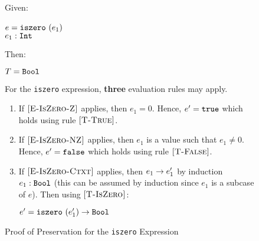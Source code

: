 \documentclass{report}
\newcommand{\rel}[1]{ \mbox{\sc [#1]} }
\begin{document}
\begin{figure}[ht!]
Given:
\begin{center}
   $e = \mbox{\tt iszero}~(e_1)$~\\
   ${e_1} : {\mbox{\tt Int}}$
\end{center}
Then:
\begin{center}
   $T = \mbox{\tt Bool}$
\end{center}
For the \texttt{iszero} expression, \textbf{three} evaluation rules may apply.
\begin{enumerate}

    \item If $\rel{E-IsZero-Z}$ applies, then $e_1 = 0$.  Hence, $e' = \mbox{\tt true}$ which holds using rule $\rel{T-True}$.
      
    \item If $\rel{E-IsZero-NZ}$ applies, then $e_1$ is a value such that $e_1 \ne 0$.  Hence, $e' = \mbox{\tt false}$ which holds using rule $\rel{T-False}$.
    
    \item If $\rel{E-IsZero-Ctxt}$ applies, then ${e_1} \rightarrow {e'_1}$ by induction ${e_1} : {\mbox{\tt Bool}}$ (this can be assumed by induction since $e_1$ is a subcase of $e$).  Then using $\rel{T-IsZero}$:
    
    \begin{center}
      ${e' = \mbox{\tt iszero}~(e'_1)} \rightarrow {\mbox{\tt Bool}}$
    \end{center}
    
\end{enumerate}

  \caption{Proof of Preservation for the \texttt{iszero} Expression}\label{fig:isZeroProofPreservation}
\end{figure} 
\end{document}
